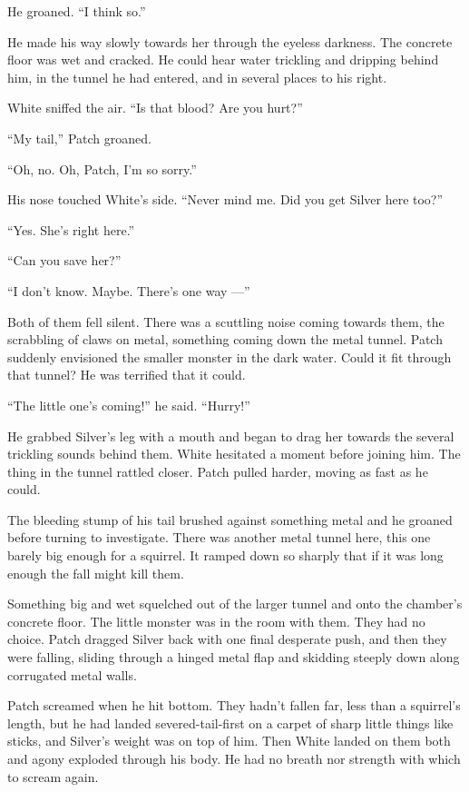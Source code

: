 \documentclass[ebook,oneside,openany,17pt]{memoir}
\begin{document}
He groaned. “I think so.”

He made his way slowly towards her through the eyeless darkness. The
concrete floor was wet and cracked. He could hear water trickling and
dripping behind him, in the tunnel he had entered, and in several
places to his right.

White sniffed the air. “Is that blood? Are you hurt?”

“My tail,” Patch groaned.

“Oh, no. Oh, Patch, I’m so sorry.”

His nose touched White’s side. “Never mind me. Did you get Silver here
too?”

“Yes. She’s right here.”

“Can you save her?”

“I don’t know. Maybe. There’s one way —”

Both of them fell silent. There was a scuttling noise coming towards
them, the scrabbling of claws on metal, something coming down the
metal tunnel. Patch suddenly envisioned the smaller monster in the
dark water. Could it fit through that tunnel? He was terrified that it
could.

“The little one’s coming!” he said. “Hurry!”

He grabbed Silver’s leg with a mouth and began to drag her towards the
several trickling sounds behind them. White hesitated a moment before
joining him. The thing in the tunnel rattled closer. Patch pulled
harder, moving as fast as he could.

The bleeding stump of his tail brushed against something metal and he
groaned before turning to investigate. There was another metal tunnel
here, this one barely big enough for a squirrel. It ramped down so
sharply that if it was long enough the fall might kill them.

Something big and wet squelched out of the larger tunnel and onto the
chamber’s concrete floor. The little monster was in the room with
them. They had no choice. Patch dragged Silver back with one final
desperate push, and then they were falling, sliding through a hinged
metal flap and skidding steeply down along corrugated metal walls.

Patch screamed when he hit bottom. They hadn’t fallen far, less than a
squirrel’s length, but he had landed severed-tail-first on a carpet of
sharp little things like sticks, and Silver’s weight was on top of
him. Then White landed on them both and agony exploded through his
body. He had no breath nor strength with which to scream again.
\end{document}
